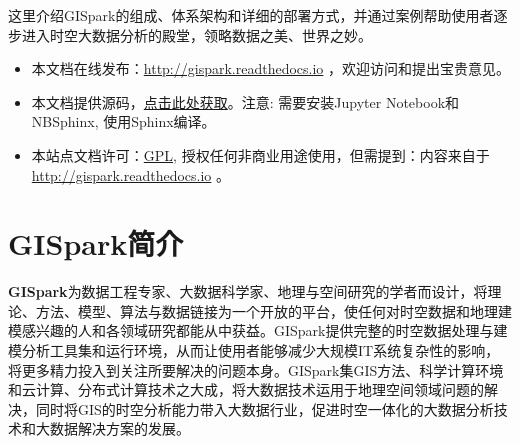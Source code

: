 \documentclass[letterpaper,10pt,english]{sphinxmanual}
\begin{document}
这里介绍GISpark的组成、体系架构和详细的部署方式，并通过案例帮助使用者逐步进入时空大数据分析的殿堂，领略数据之美、世界之妙。
\begin{itemize}
\item {} 
本文档在线发布：\url{http://gispark.readthedocs.io}
，欢迎访问和提出宝贵意见。

\item {} 
本文档提供源码，\href{http://nbviewer.jupyter.org/github/supergis/GISpark\_doc/tree/master/source}{点击此处获取}。注意:
需要安装Jupyter Notebook和NBSphinx, 使用Sphinx编译。

\item {} 
本站点文档许可：\href{http://www.gnu.org/licenses/gpl-3.0.html}{GPL},
授权任何非商业用途使用，但需提到：内容来自于
\url{http://gispark.readthedocs.io} 。

\end{itemize}


\section{GISpark简介}
\label{gispark_profile:GISpark_u7b80_u4ecb}\label{gispark_profile::doc}
\textbf{GISpark}为数据工程专家、大数据科学家、地理与空间研究的学者而设计，将理论、方法、模型、算法与数据链接为一个开放的平台，使任何对时空数据和地理建模感兴趣的人和各领域研究都能从中获益。GISpark提供完整的时空数据处理与建模分析工具集和运行环境，从而让使用者能够减少大规模IT系统复杂性的影响，将更多精力投入到关注所要解决的问题本身。GISpark集GIS方法、科学计算环境和云计算、分布式计算技术之大成，将大数据技术运用于地理空间领域问题的解决，同时将GIS的时空分析能力带入大数据行业，促进时空一体化的大数据分析技术和大数据解决方案的发展。
\end{document}

